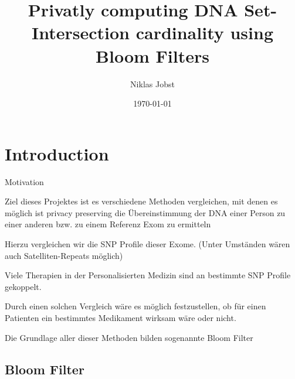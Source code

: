 \documentclass{beamer}
\title[Privatly computing Set-Intersection]{Privatly computing DNA Set-Intersection cardinality using Bloom Filters}
\author{Niklas Jobst}
\institute{TCS - Universität zu Lübeck}
\date{\today}
\begin{document}
	
	\begin{frame}
		\titlepage
	\end{frame}
	
	
	\section{Introduction}
	
	\begin{frame}{Motivation}
		
		\begin{arrowlist}
			\item  Ziel dieses Projektes ist es verschiedene Methoden vergleichen, mit denen es möglich ist privacy preserving die Übereinstimmung der DNA einer Person zu einer anderen bzw. zu einem Referenz Exom zu ermitteln
			\item Hierzu vergleichen wir die SNP Profile dieser Exome.	
			(Unter Umständen wären auch Satelliten-Repeats möglich)
			
		\end{arrowlist}
		
		
		
	\end{frame}
	
	\begin{frame}
		
		\begin{arrowlist}
			
			\item Viele Therapien in der Personalisierten Medizin sind an bestimmte SNP Profile gekoppelt.
			\item Durch einen solchen Vergleich wäre es möglich festzustellen, ob für einen Patienten ein bestimmtes Medikament wirksam wäre oder nicht. 
			\item Die Grundlage aller dieser Methoden bilden sogenannte Bloom Filter
		\end{arrowlist}
		
		
		
	\end{frame}
	\subsection{Bloom Filter}
	
\end{document}
